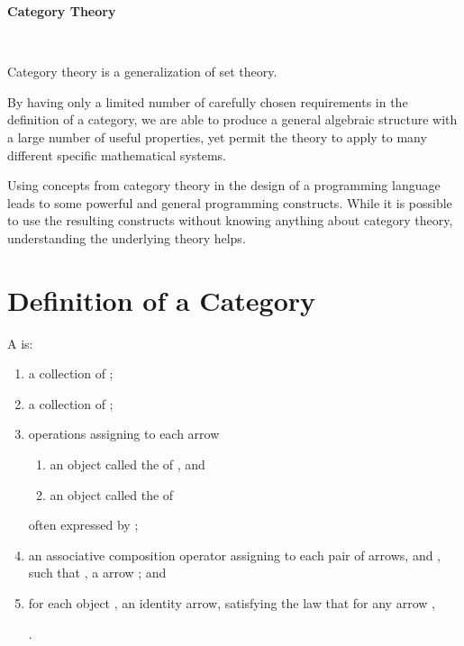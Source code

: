\documentclass{seminar}
\begin{document}
\begin{slide}

\begin{center}
\begin{LARGE}
\textbf{Category Theory}
\end{LARGE}\\[3ex]
\end{center}

Category theory is a generalization of set theory.

By having only a limited
number of carefully chosen
requirements in the definition of a category, we are able to
produce a general algebraic structure with a large number of useful
properties, yet permit the theory to apply to many different specific
mathematical
systems.

Using concepts from category theory in the design of a programming
language leads to some powerful and general programming constructs.
While it is
possible to use the resulting constructs without
knowing anything about category theory,
understanding the underlying theory helps.

\newslide

\section*{Definition of a Category}

A   is:
\begin{enumerate}
\item a collection of ;
\item a collection of ;
\item operations assigning to each arrow 
\begin{enumerate}
\item an object  called the  of ,
and
\item an object  called the  of
\end{enumerate}
often expressed by ;
\item an associative composition operator \tm{\circ} assigning to
each pair
of arrows,  and , such that , a
 arrow ; and
\item for each object , an identity arrow, 
satisfying the law that for any arrow ,
\begin{codenott}
.
\end{codenott}
\end{enumerate}


\end{slide}
\end{document}
